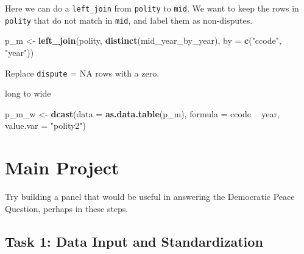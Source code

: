 \documentclass[]{book}
\newenvironment{Shaded}{\begin{snugshade}}{\end{snugshade}}
\newcommand{\KeywordTok}[1]{\textcolor[rgb]{0.13,0.29,0.53}{\textbf{#1}}}
\newcommand{\DataTypeTok}[1]{\textcolor[rgb]{0.13,0.29,0.53}{#1}}
\newcommand{\DecValTok}[1]{\textcolor[rgb]{0.00,0.00,0.81}{#1}}
\newcommand{\StringTok}[1]{\textcolor[rgb]{0.31,0.60,0.02}{#1}}
\newcommand{\OperatorTok}[1]{\textcolor[rgb]{0.81,0.36,0.00}{\textbf{#1}}}
\newcommand{\NormalTok}[1]{#1}
\theoremstyle{definition}
\theoremstyle{definition}
\theoremstyle{definition}
\theoremstyle{remark}
\begin{document}
Here we can do a \texttt{left\_join} from \texttt{polity} to
\texttt{mid}. We want to keep the rows in \texttt{polity} that do not
match in \texttt{mid}, and label them as non-disputes.

\begin{Shaded}
\begin{Highlighting}[]
\NormalTok{p_m <-}\StringTok{ }\KeywordTok{left_join}\NormalTok{(polity,}
                 \KeywordTok{distinct}\NormalTok{(mid_year_by_year),}
                 \DataTypeTok{by =} \KeywordTok{c}\NormalTok{(}\StringTok{"ccode"}\NormalTok{, }\StringTok{"year"}\NormalTok{))}
\end{Highlighting}
\end{Shaded}

Replace \texttt{dispute} = NA rows with a zero.

\begin{Shaded}
\end{Shaded}

long to wide

\begin{Shaded}
\begin{Highlighting}[]
\NormalTok{p_m_w <-}\StringTok{ }\KeywordTok{dcast}\NormalTok{(}\DataTypeTok{data =} \KeywordTok{as.data.table}\NormalTok{(p_m),}
               \DataTypeTok{formula =}\NormalTok{ ccode }\OperatorTok{~}\StringTok{ }\NormalTok{year,}
               \DataTypeTok{value.var =} \StringTok{"polity2"}\NormalTok{)}
\end{Highlighting}
\end{Shaded}

\section{Main Project}\label{main-project}

Try building a panel that would be useful in answering the Democratic
Peace Question, perhaps in these steps.

\subsection{Task 1: Data Input and
Standardization}\label{task-1-data-input-and-standardization}
\end{document}
